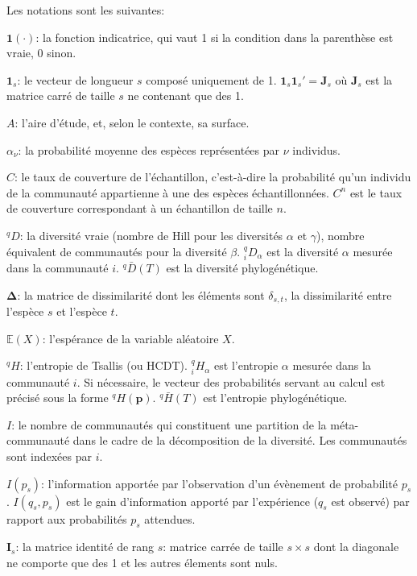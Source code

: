\documentclass[
  11pt,
  american,
  a4paper,
  extrafontsizes,onecolumn,openright
  ]{memoir}
\newlength{\rf}
\begin{document}
Les notations sont les suivantes:

\noindent \({\mathbf 1}(\cdot)\): la fonction indicatrice, qui vaut 1 si la condition dans la parenthèse est vraie, 0 sinon.

\noindent \(\mathbf{1}_s\): le vecteur de longueur \(s\) composé uniquement de 1. \(\mathbf{1}_s\mathbf{1}_s'=\mathbf{J}_s\) où \(\mathbf{J}_s\) est la matrice carré de taille \(s\) ne contenant que des 1.

\noindent \(A\): l'aire d'étude, et, selon le contexte, sa surface.

\noindent \(\alpha_\nu\): la probabilité moyenne des espèces représentées par \(\nu\) individus.

\noindent \(C\): le taux de couverture de l'échantillon, c'est-à-dire la probabilité qu'un individu de la communauté appartienne à une des espèces échantillonnées.
\(C^{n}\) est le taux de couverture correspondant à un échantillon de taille \(n\).

\noindent \(^{q}\!D\): la diversité vraie (nombre de Hill pour les diversités \(\alpha\) et \(\gamma\)), nombre équivalent de communautés pour la diversité \(\beta\).
\(^{q}_{i}\!D_{\alpha}\) est la diversité \(\alpha\) mesurée dans la communauté \(i\).
\(^{q}\!\bar{D}\left(T\right)\) est la diversité phylogénétique.

\noindent \(\boldsymbol{\Delta}\): la matrice de dissimilarité dont les éléments sont \(\delta_{s,t}\), la dissimilarité entre l'espèce \(s\) et l'espèce \(t\).

\noindent \({\mathbb E}\left(X\right)\): l'espérance de la variable aléatoire \(X\).

\noindent \(^{q}\!H\): l'entropie de Tsallis (ou HCDT).
\(^{q}_{i}\!H_{\alpha}\) est l'entropie \(\alpha\) mesurée dans la communauté \(i\).
Si nécessaire, le vecteur des probabilités servant au calcul est précisé sous la forme \(^{q}\!H(\mathbf{p})\).
\(^{q}\!\bar{H}(T)\) est l'entropie phylogénétique.

\noindent \(I\): le nombre de communautés qui constituent une partition de la méta-communauté dans le cadre de la décomposition de la diversité.
Les communautés sont indexées par \(i\).

\noindent \(I(p_s)\): l'information apportée par l'observation d'un évènement de probabilité \(p_s\).
\(I(q_s,p_s)\) est le gain d'information apporté par l'expérience (\(q_s\) est observé) par rapport aux probabilités \(p_s\) attendues.

\noindent \(\mathbf{I}_s\): la matrice identité de rang \(s\): matrice carrée de taille \(s\times s\) dont la diagonale ne comporte que des 1 et les autres élements sont nuls.
\end{document}
